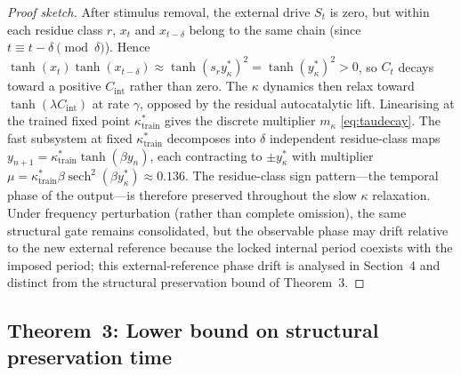 \begin{proof}[Proof sketch]
After stimulus removal, the external drive $S_t$ is zero, but within each residue class $r$, $x_t$ and $x_{t-\delta}$ belong to the same chain (since $t \equiv t-\delta \pmod{\delta}$). Hence $\tanh(x_t)\tanh(x_{t-\delta}) \approx \tanh(s_r y_\kappa^*)^2 = \tanh(y_\kappa^*)^2 > 0$, so $C_t$ decays toward a positive $C_{\mathrm{int}}$ rather than zero. The $\kappa$ dynamics then relax toward $\tanh(\lambda C_{\mathrm{int}})$ at rate $\gamma$, opposed by the residual autocatalytic lift. Linearising at the trained fixed point $\kappa^*_{\mathrm{train}}$ gives the discrete multiplier $m_\kappa$ \eqref{eq:taudecay}. The fast subsystem at fixed $\kappa^*_{\mathrm{train}}$ decomposes into $\delta$ independent residue-class maps $y_{n+1} = \kappa^*_{\mathrm{train}}\tanh(\beta y_n)$, each contracting to $\pm y^*_\kappa$ with multiplier $\mu = \kappa^*_{\mathrm{train}}\beta\operatorname{sech}^2(\beta y^*_\kappa) \approx 0.136$. The residue-class sign pattern---the temporal phase of the output---is therefore preserved throughout the slow $\kappa$ relaxation. Under frequency perturbation (rather than complete omission), the same structural gate remains consolidated, but the observable phase may drift relative to the new external reference because the locked internal period coexists with the imposed period; this external-reference phase drift is analysed in Section~4 and distinct from the structural preservation bound of Theorem~3.
\end{proof}

\subsection{Theorem~3: Lower bound on structural preservation time}

